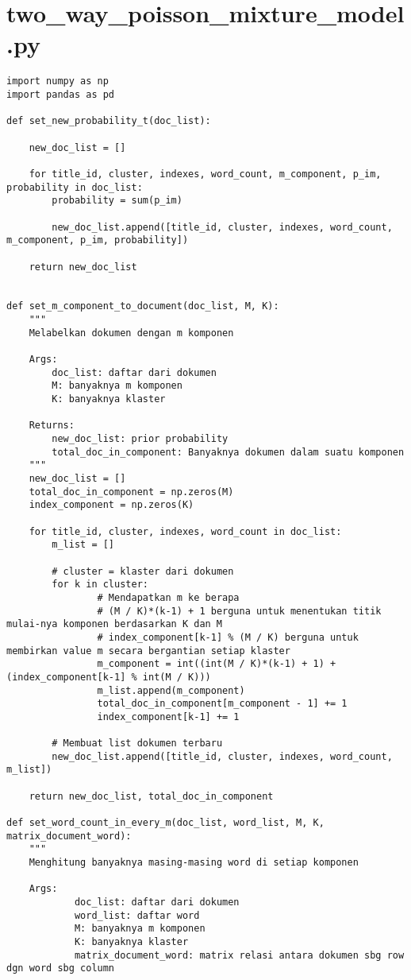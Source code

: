 \chapter{two\_way\_poisson\_mixture\_model.py}
\begin{lstlisting}[breaklines=true]
import numpy as np
import pandas as pd

def set_new_probability_t(doc_list):
	
	new_doc_list = []
	
	for title_id, cluster, indexes, word_count, m_component, p_im, probability in doc_list:
		probability = sum(p_im)
		
		new_doc_list.append([title_id, cluster, indexes, word_count, m_component, p_im, probability])
	
	return new_doc_list
	

def set_m_component_to_document(doc_list, M, K):
	"""
	Melabelkan dokumen dengan m komponen

	Args:
		doc_list: daftar dari dokumen
		M: banyaknya m komponen
		K: banyaknya klaster

	Returns:
		new_doc_list: prior probability
		total_doc_in_component: Banyaknya dokumen dalam suatu komponen
	"""
	new_doc_list = []
	total_doc_in_component = np.zeros(M)
	index_component = np.zeros(K)
	
	for title_id, cluster, indexes, word_count in doc_list:
		m_list = []
		
		# cluster = klaster dari dokumen
		for k in cluster:
				# Mendapatkan m ke berapa
				# (M / K)*(k-1) + 1 berguna untuk menentukan titik mulai-nya komponen berdasarkan K dan M
				# index_component[k-1] % (M / K) berguna untuk membirkan value m secara bergantian setiap klaster
				m_component = int((int(M / K)*(k-1) + 1) + (index_component[k-1] % int(M / K)))
				m_list.append(m_component) 
				total_doc_in_component[m_component - 1] += 1
				index_component[k-1] += 1

		# Membuat list dokumen terbaru
		new_doc_list.append([title_id, cluster, indexes, word_count, m_list])
	
	return new_doc_list, total_doc_in_component

def set_word_count_in_every_m(doc_list, word_list, M, K, matrix_document_word):
	"""
	Menghitung banyaknya masing-masing word di setiap komponen

	Args:
			doc_list: daftar dari dokumen
			word_list: daftar word
			M: banyaknya m komponen
			K: banyaknya klaster
			matrix_document_word: matrix relasi antara dokumen sbg row dgn word sbg column


\end{lstlisting}

